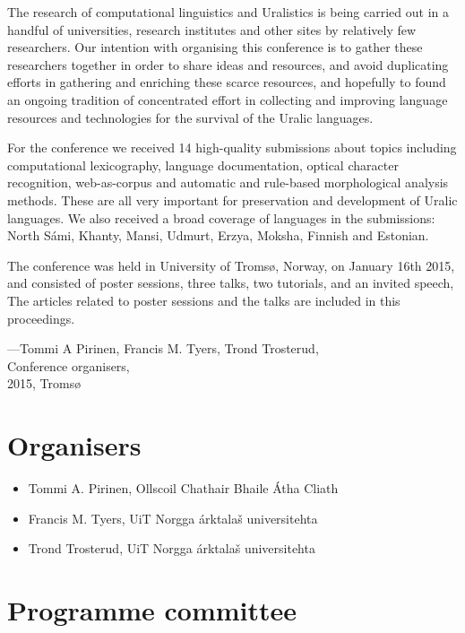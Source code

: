 \documentclass[b5paper]{book}
\newcommand\thedoi{10.7557/scs.2015.2}
\begin{document}
The research of computational linguistics and Uralistics is being carried out
in a handful of universities, research institutes and other sites by
relatively few researchers. Our intention with organising this conference is to
gather these researchers together in order to share ideas and resources, and
avoid duplicating efforts in gathering and enriching these scarce resources,
and hopefully to found an ongoing tradition of concentrated effort in
collecting and improving language resources and technologies for the survival
of the Uralic languages.

For the conference we received 14 high-quality submissions about topics
including computational lexicography, language documentation, optical character
recognition, web-as-corpus and automatic and rule-based morphological analysis
methods.  These are all very important for preservation and development of
Uralic languages. We also received a broad coverage of languages in the
submissions: North Sámi, Khanty, Mansi, Udmurt, Erzya, Moksha, Finnish and
Estonian.

The conference was held in University of Tromsø, Norway, on January 16th 2015,
and consisted of poster sessions, three talks,
two tutorials, and an invited speech,
The articles related to poster sessions and the talks are included in this
proceedings.

\noindent ---Tommi A Pirinen, Francis M. Tyers, Trond Trosterud,\\
Conference organisers,\\
2015, Tromsø

\renewcommand\thedoi{10.7557/5.3463}

\chapter*{Organisers}

\begin{itemize}
    \item Tommi A. Pirinen, Ollscoil Chathair Bhaile Átha Cliath
    \item Francis M. Tyers, UiT Norgga árktalaš universitehta
    \item Trond Trosterud, UiT Norgga árktalaš universitehta
\end{itemize}

\renewcommand\thedoi{10.7557/5.3464}

\chapter*{Programme committee}
\end{document}
